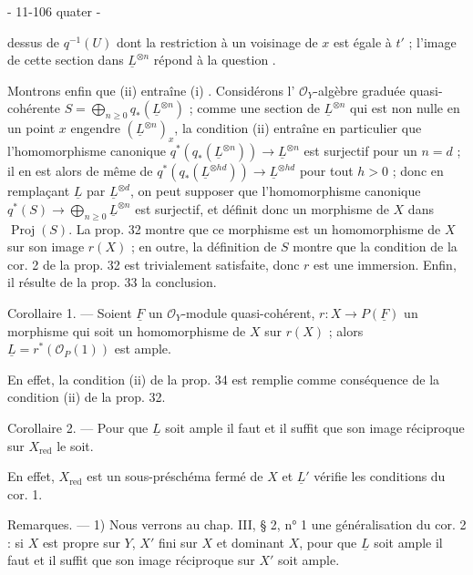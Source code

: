 \newpage


- 11-106 quater -

dessus de $q^{-1}(U)$ dont la restriction à un voisinage de $x$ est égale à $t'$ ; l'image de cette section dans $\underline{L}^{\otimes n}$ répond à la question .

Montrons enfin que (ii) entraîne (i) . Considérons l' $\mathcal{O}_Y$-algèbre graduée quasi-cohérente $S = \bigoplus_{n \geq 0} q_*(\underline{L}^{\otimes n})$ ; comme une section de $\underline{L}^{\otimes n}$ qui est non nulle en un point $x$ engendre $(\underline{L}^{\otimes n})_x$, la condition (ii) entraîne en particulier que l'homomorphisme canonique $q^*(q_*(\underline{L}^{\otimes n})) \to \underline{L}^{\otimes n}$ est surjectif pour un $n=d$ ; il en est alors de même de $q^*(q_*(\underline{L}^{\otimes hd})) \to \underline{L}^{\otimes hd}$ pour tout $h > 0$ ; donc en remplaçant $\underline{L}$ par $\underline{L}^{\otimes d}$, on peut supposer que l'homomorphisme canonique $q^*(S) \to \bigoplus_{n \geq 0} \underline{L}^{\otimes n}$ est surjectif, et définit donc un morphisme de $X$ dans $\operatorname{Proj}(S)$. La prop. 32 montre que ce morphisme est un homomorphisme de $X$ sur son image $r(X)$ ; en outre, la définition de $S$ montre que la condition de la cor. 2 de la prop. 32 est trivialement satisfaite, donc $r$ est une immersion. Enfin, il résulte de la prop. 33 la conclusion.

Corollaire 1. — Soient $\underline{F}$ un $\mathcal{O}_Y$-module quasi-cohérent, $r: X \to P(\underline{F})$ un morphisme qui soit un homomorphisme de $X$ sur $r(X)$ ; alors $\underline{L} = r^*(\mathcal{O}_P(1))$ est ample.

En effet, la condition (ii) de la prop. 34 est remplie comme conséquence de la condition (ii) de la prop. 32.

Corollaire 2. — Pour que $\underline{L}$ soit ample il faut et il suffit que son image réciproque sur $X_{\operatorname{red}}$ le soit.

En effet, $X_{\operatorname{red}}$ est un sous-préschéma fermé de $X$ et $\underline{L}'$ vérifie les conditions du cor. 1.

Remarques. — 1) Nous verrons au chap. III, § 2, n° 1 une généralisation du cor. 2 : si $X$ est propre sur $Y$, $X'$ fini sur $X$ et dominant $X$, pour que $\underline{L}$ soit ample il faut et il suffit que son image réciproque sur $X'$ soit ample.

\newpage

